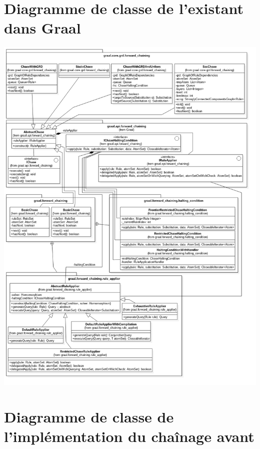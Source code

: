 
\appendix 
{}
\section{Diagramme de classe de l'existant dans Graal}\label{sec:dia_classe_existant}

        \begin{center}
        \includegraphics[width=\textwidth]{pictures/existingGraal.png}    
        \vspace{-120pt}
        \end{center}
\section{Diagramme de classe de l'implémentation du chaînage avant}\label{sec:dia_classe_nouveau}

